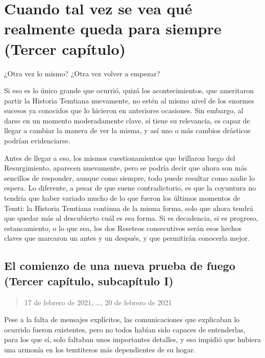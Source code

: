 \documentclass[
  spanish,
]{book}
\begin{document}
\hypertarget{cuando-tal-vez-se-vea-quuxe9-realmente-queda-para-siempre-tercer-capuxedtulo}{%
\chapter{Cuando tal vez se vea qué realmente queda para siempre (Tercer capítulo)}\label{cuando-tal-vez-se-vea-quuxe9-realmente-queda-para-siempre-tercer-capuxedtulo}}

¿Otra vez lo mismo? ¿Otra vez volver a empezar?

Si eso es lo único grande que ocurrió, quizá los acontecimientos, que ameritaron partir la Historia Temtiana nuevamente, no estén al mismo nivel de los enormes sucesos ya conocidos que lo hicieron en anteriores ocasiones. Sin embargo, al darse en un momento moderadamente clave, sí tiene su relevancia, es capaz de llegar a cambiar la manera de ver la misma, y así uno o más cambios drásticos podrían evidenciarse.

Antes de llegar a eso, los mismos cuestionamientos que brillaron luego del Resurgimiento, aparecen nuevamente, pero se podría decir que ahora son más sencillos de responder, aunque como siempre, todo puede resultar como nadie lo espera. Lo diferente, a pesar de que suene contradictorio, es que la coyuntura no tendría que haber variado mucho de lo que fueron los últimos momentos de Temti: la Historia Temtiana continua de la misma forma, solo que ahora tendrá que quedar más al descubierto cuál es esa forma. Si es decadencia, si es progreso, estancamiento, o lo que sea, los dos Reseteos consecutivos serán esos hechos claves que marcaron un antes y un después, y que permitirán conocerla mejor.

\hypertarget{el-comienzo-de-una-nueva-prueba-de-fuego-tercer-capuxedtulo-subcapuxedtulo-i}{%
\section{El comienzo de una nueva prueba de fuego (Tercer capítulo, subcapítulo I)}\label{el-comienzo-de-una-nueva-prueba-de-fuego-tercer-capuxedtulo-subcapuxedtulo-i}}

\begin{quote}
17 de febrero de 2021, \ldots, 20 de febrero de 2021
\end{quote}

Pese a la falta de mensajes explícitos, las comunicaciones que explicaban lo ocurrido fueron existentes, pero no todos habían sido capaces de entenderlas, para los que sí, solo faltaban unos importantes detalles, y eso impidió que hubiera una armonía en los temtiteros más dependientes de su hogar.
\end{document}
